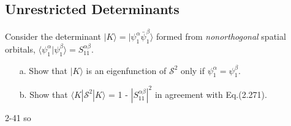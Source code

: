 \documentclass[a4paper]{book}
\begin{document}
	\subsection{Unrestricted Determinants}
	
	\begin{exercise}
	Consider the determinant $| K \rangle = |\psi_1^\alpha \bar{\psi}^\beta_1 \rangle$ formed from {\it nonorthogonal} spatial orbitals, $\langle \psi^\alpha_1 | \psi^\beta_1 \rangle = S^{\alpha\beta}_{11}$. 
	\begin{enumerate}
	
	\item[a.] Show that $| K \rangle$ is an eigenfunction of $\mathscr{S}^2$ only if $\psi^\alpha_1 = \psi^\beta_1$.
	
	\item[b.] Show that $\langle K | \mathscr{S}^2 | K \rangle$ = 1 - $|S^{\alpha\beta}_{11}|^2$ in agreement with Eq.(2.271).	
	
	\end{enumerate}
	\end{exercise}
	
	\begin{solution}
		2-41 so
	\end{solution}
	
\end{document}
